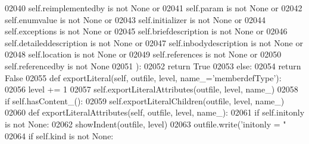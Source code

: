 \begin{DoxyCode}
{{{{{{{{{{{{{{{{{{{{{{{{{{{{{{{{{{{{{{{{{{{{{{{{{{{{{{{{{{{{{{{{{{{{{{{{{{{{{{{{{{{{{{{{{{{{{{{{{{{{{{{{{{{{{{{{{{{{{{{{{{{{{{{{{{{{{{{{{{{{{{{02040             self.reimplementedby \textcolor{keywordflow}{is} \textcolor{keywordflow}{not} \textcolor{keywordtype}{None} \textcolor{keywordflow}{or}
02041             self.param \textcolor{keywordflow}{is} \textcolor{keywordflow}{not} \textcolor{keywordtype}{None} \textcolor{keywordflow}{or}
02042             self.enumvalue \textcolor{keywordflow}{is} \textcolor{keywordflow}{not} \textcolor{keywordtype}{None} \textcolor{keywordflow}{or}
02043             self.initializer \textcolor{keywordflow}{is} \textcolor{keywordflow}{not} \textcolor{keywordtype}{None} \textcolor{keywordflow}{or}
02044             self.exceptions \textcolor{keywordflow}{is} \textcolor{keywordflow}{not} \textcolor{keywordtype}{None} \textcolor{keywordflow}{or}
02045             self.briefdescription \textcolor{keywordflow}{is} \textcolor{keywordflow}{not} \textcolor{keywordtype}{None} \textcolor{keywordflow}{or}
02046             self.detaileddescription \textcolor{keywordflow}{is} \textcolor{keywordflow}{not} \textcolor{keywordtype}{None} \textcolor{keywordflow}{or}
02047             self.inbodydescription \textcolor{keywordflow}{is} \textcolor{keywordflow}{not} \textcolor{keywordtype}{None} \textcolor{keywordflow}{or}
02048             self.location \textcolor{keywordflow}{is} \textcolor{keywordflow}{not} \textcolor{keywordtype}{None} \textcolor{keywordflow}{or}
02049             self.references \textcolor{keywordflow}{is} \textcolor{keywordflow}{not} \textcolor{keywordtype}{None} \textcolor{keywordflow}{or}
02050             self.referencedby \textcolor{keywordflow}{is} \textcolor{keywordflow}{not} \textcolor{keywordtype}{None}
02051             ):
02052             \textcolor{keywordflow}{return} \textcolor{keyword}{True}
02053         \textcolor{keywordflow}{else}:
02054             \textcolor{keywordflow}{return} \textcolor{keyword}{False}
02055     \textcolor{keyword}{def }exportLiteral(self, outfile, level, name\_='memberdefType'):
02056         level += 1
02057         self.exportLiteralAttributes(outfile, level, name\_)
02058         \textcolor{keywordflow}{if} self.hasContent_():
02059             self.exportLiteralChildren(outfile, level, name\_)
02060     \textcolor{keyword}{def }exportLiteralAttributes(self, outfile, level, name\_):
02061         \textcolor{keywordflow}{if} self.initonly \textcolor{keywordflow}{is} \textcolor{keywordflow}{not} \textcolor{keywordtype}{None}:
02062             showIndent(outfile, level)
02063             outfile.write(\textcolor{stringliteral}{'initonly = "%
02064         \textcolor{keywordflow}{if} self.kind \textcolor{keywordflow}{is} \textcolor{keywordflow}{not} \textcolor{keywordtype}{None}:
}}}}}}}}}}}}}}}}}}}}}}}}}}}}}}}}}}}}}}}}}}}}}}}}}}}}}}}}}}}}}}}}}}}}}}}}}}}}}}}}}}}}}}}}}}}}}}}}}}}}}}}}}}}}}}}}}}}}}}}}}}}}}}}}}}}}}}}}}}}}}}}}
\end{DoxyCode}
